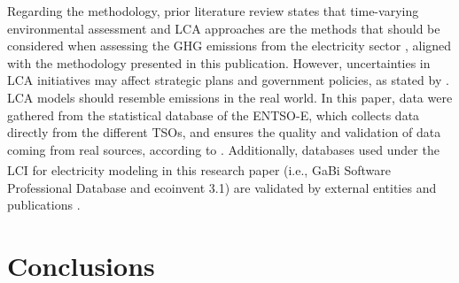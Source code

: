 {{{{%

{Regarding the methodology, prior literature review states that time-varying environmental assessment and LCA approaches are the methods that should  be considered when assessing the GHG emissions from the electricity sector \cite{Khan2019GHGreview, Khan2019CarbonIntensity, Baumann2019, MESSAGIE2014469}, aligned with the methodology presented in this publication. However, uncertainties in LCA initiatives may affect strategic plans and government policies, as stated by \cite{madushela2016data}. LCA models should resemble emissions in the real world. In this paper, data were gathered from the statistical database of the ENTSO-E, which collects data directly from the different TSOs, and ensures the quality and validation of data coming from real sources, according to \cite{Hirth2018ThePlatform}. Additionally, databases used under the LCI for electricity modeling in this research paper (i.e., GaBi\textsuperscript{\textregistered} Software Professional Database and ecoinvent 3.1) are validated by external entities and publications \cite{Buyle2019, 2006ISOGuidelines}.}
\section{Conclusions} \label{Conclusions}

}}}}
